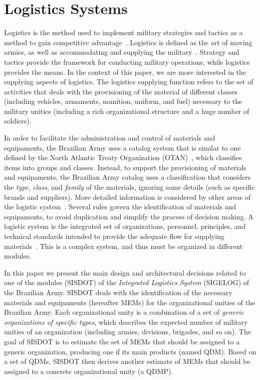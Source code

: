 \section{Logistics Systems}\label{sec:logistics}

Logistics is the method used to implement military strategies and tactics as a method to gain 
competitive advantage~\cite{rutner2012}. Logistics is defined as the art of moving armies, 
as well as accommodating and supplying the military~\cite{prebilic2006}. Strategy and tactics 
provide the framework for conducting military operations, while logistics provides the means.
In the context of this paper, we are more interested in the supplying aspects of logistics. 
The logistics supplying function refers to the set of activities that deals with the  provisioning of 
the material of different classes (including vehicles, armaments, munition, uniform, and fuel) necessary to the 
military unities (including a rich organizational structure and a huge number of soldiers). 

In order to facilitate the administration and control of materials and equipaments, the Brazilian Army uses a 
catalog system that is similar to one defined by the North Atlantic Treaty Organization (OTAN)~\cite{otan2012}, 
which classifies items into groups and classes. Instead, to support the provisioning of materials and equipaments, 
the Brazilian Army catalog uses a classification that considers the \emph{type}, \emph{class}, and \emph{family} of the 
materials, ignoring some details (such as specific brands and suppliers). More detailed information is considered by 
other areas of the logistic system~\cite{brasil2003}. Several rules govern the identification of materials and equipaments, 
to avoid duplication and simplify the process of decision making. A logistic system is the integrated set of organizations, 
personnel, principles, and technical standards intended to provide the adequate flow for supplying materials~\cite{brasil2003}. 
This is a complex system, and thus must be organized in different modules. 

In this paper we present the main design and architectural decisions related to one of the modules (SISDOT) of the \emph{Integrated 
Logistics System} (SIGELOG) of the Brazilian Army. SISDOT deals with the identification of the necessary 
materials and equipaments (hereafter MEMs) for the organizational unities of the Brazilian Army. Each organizational 
unity is a combination of a set of \emph{generic organizations of specific types}, which describes the expected 
number of military unities of an organization (including armies, divisions, brigades, and so on). The goal of 
SISDOT is to estimate the set of MEMs that should be assigned to a generic organization, producing 
one if its main products (named QDM). Based on a set of QDMs, SISDOT then derives another estimate 
of MEMs that should be assigned to a concrete organizational unity (a QDMP). 

